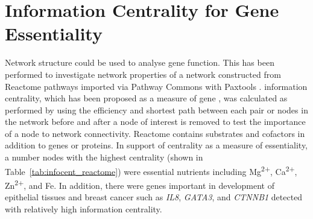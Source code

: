 \FloatBarrier

\chapter{Information Centrality for Gene Essentiality}
\label{appendix:infocent_essential}

\FloatBarrier


Network structure could be used to analyse gene function. This has been performed to investigate network properties of a network constructed from Reactome pathways \citep{Reactome} imported via Pathway Commons with Paxtools \citep{PathwayCommons, paxtools}. \Gls{information centrality}, which has been proposed as a measure of gene , was calculated as performed by \citet{Kranthi2013} using the efficiency and shortest path between each pair or nodes in the network before and after a node of interest is removed to test the importance of a node to network connectivity. Reactome contains substrates and cofactors in addition to genes or proteins. In support of centrality as a measure of essentiality, a number nodes with the highest centrality (shown in Table~\ref{tab:infocent_reactome}) were essential nutrients including Mg\textsuperscript{2$+$}, Ca\textsuperscript{2$+$}, Zn\textsuperscript{2$+$},  and Fe. In addition, there were genes important in development of epithelial tissues and breast cancer such as \textit{IL8}, \textit{GATA3}, and \textit{CTNNB1} detected with relatively high \gls{information centrality}. 

